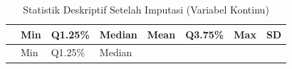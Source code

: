 \documentclass[
  11pt,
]{article}
\begin{document}
\begin{longtable}[]{@{}
  >{\raggedright\arraybackslash}p{}
  >{\raggedleft\arraybackslash}p{}
  >{\raggedleft\arraybackslash}p{}
  >{\raggedleft\arraybackslash}p{}
  >{\raggedleft\arraybackslash}p{}
  >{\raggedleft\arraybackslash}p{}
  >{\raggedleft\arraybackslash}p{}
  >{\raggedleft\arraybackslash}p{}@{}}
\caption{Statistik Deskriptif Setelah Imputasi (Variabel
Kontinu)}\tabularnewline
\toprule\noalign{}
\begin{minipage}[b]{\linewidth}\raggedright
\end{minipage} & \begin{minipage}[b]{\linewidth}\raggedleft
Min
\end{minipage} & \begin{minipage}[b]{\linewidth}\raggedleft
Q1.25\%
\end{minipage} & \begin{minipage}[b]{\linewidth}\raggedleft
Median
\end{minipage} & \begin{minipage}[b]{\linewidth}\raggedleft
Mean
\end{minipage} & \begin{minipage}[b]{\linewidth}\raggedleft
Q3.75\%
\end{minipage} & \begin{minipage}[b]{\linewidth}\raggedleft
Max
\end{minipage} & \begin{minipage}[b]{\linewidth}\raggedleft
SD
\end{minipage} \\
\midrule\noalign{}
\endfirsthead
\toprule\noalign{}
\begin{minipage}[b]{\linewidth}\raggedright
\end{minipage} & \begin{minipage}[b]{\linewidth}\raggedleft
Min
\end{minipage} & \begin{minipage}[b]{\linewidth}\raggedleft
Q1.25\%
\end{minipage} & \begin{minipage}[b]{\linewidth}\raggedleft
Median
\end{minipage} & \begin{minipage}[b]{\linewidth}\raggedleft

\end{minipage}
\end{longtable}
\end{document}
